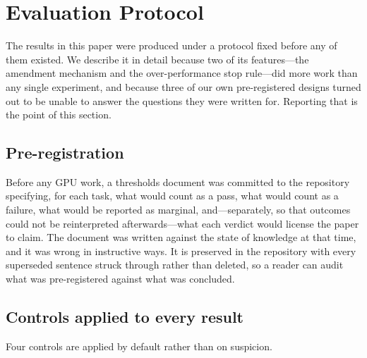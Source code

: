 \section{Evaluation Protocol}
\label{sec:protocol}

The results in this paper were produced under a protocol fixed before any of them existed. We describe it in detail
because two of its features---the amendment mechanism and the over-performance stop rule---did more work than any
single experiment, and because three of our own pre-registered designs turned out to be unable to answer the questions
they were written for. Reporting that is the point of this section.

\subsection{Pre-registration}
\label{sec:prereg}

Before any GPU work, a thresholds document was committed to the repository specifying, for each task, what would
count as a pass, what would count as a failure, what would be reported as marginal, and---separately, so that outcomes
could not be reinterpreted afterwards---what each verdict would license the paper to claim. The document was written
against the state of knowledge at that time, and it was wrong in instructive ways. It is preserved in the repository
with every superseded sentence struck through rather than deleted, so a reader can audit what was pre-registered
against what was concluded.

\subsection{Controls applied to every result}
\label{sec:controls}

Four controls are applied by default rather than on suspicion.

